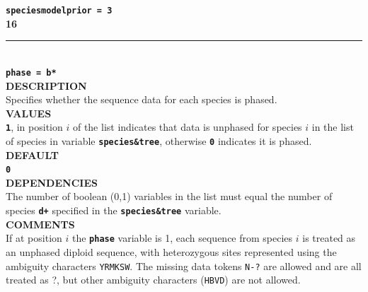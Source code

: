 \documentclass[a4paper]{book}
\numberwithin{equation}{section} \renewcommand{\baselinestretch}{0.55}
\begin{document}
\textbf{\texttt{speciesmodelprior = 3}}\vspace{10pt}\\
\textbf{{\large 16}} \\
\noindent\rule{\textwidth}{0.8pt} \\
\textbf{{\Large \texttt{phase = b*}}} \vspace{5pt}\\
\textbf{DESCRIPTION} \vspace{5pt}\\
Specifies whether the sequence data for each species is phased.
\vspace{5pt}\\
\textbf{VALUES} \vspace{5pt}\\
\textbf{\texttt{1}}, in position $i$ of the list indicates that data is unphased for species $i$ in the list of species in variable \textbf{\texttt{species\&tree}}, otherwise \textbf{\texttt{0}} indicates it is phased. \vspace{5pt}\\
\textbf{DEFAULT} \vspace{5pt}\\
\textbf{\texttt{0}} \vspace{5pt}\\
\textbf{DEPENDENCIES} \vspace{5pt}\\
The number of boolean (0,1) variables in the list must equal the number of species \textbf{\texttt{d+}} specified in the \textbf{\texttt{species\&tree}} variable. \vspace{5pt}\\
\textbf{COMMENTS} \vspace{5pt}\\
If at position $i$ the \textbf{\texttt{phase}} variable is 1, each
sequence from species $i$ is treated as an unphased diploid sequence,
with heterozygous sites represented using the ambiguity characters
\texttt{YRMKSW}.  The missing data tokens \texttt{N-?} are allowed and
are all treated as ?, but other ambiguity characters (\texttt{HBVD})
are not allowed.
\end{document}
